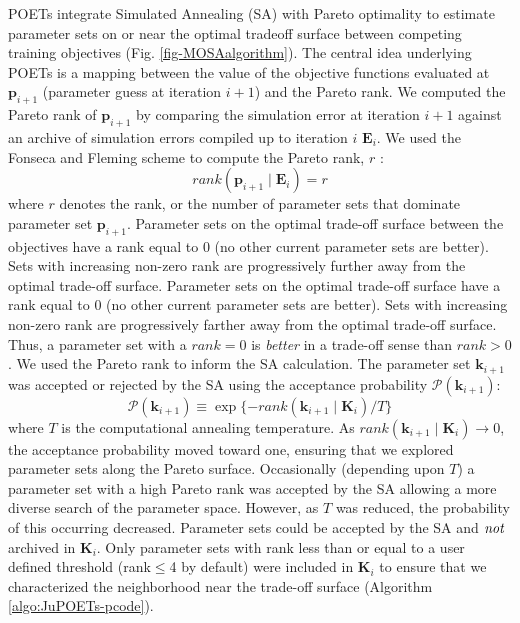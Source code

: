 \documentclass{bmcart}
\begin{document}
POETs integrate Simulated Annealing (SA) with Pareto optimality to estimate parameter sets on or near the optimal tradeoff surface between competing training objectives (Fig. \ref{fig-MOSAalgorithm}).
The central idea underlying POETs is a mapping between the value of the objective functions evaluated at $\mathbf{p}_{i+1}$ (parameter guess at iteration $i+1$) and the Pareto rank.
We computed the Pareto rank of $\mathbf{p}_{i+1}$ by comparing the simulation error at iteration $i+1$ against an archive of simulation errors compiled up to iteration $i$ $\mathbf{E}_{i}$.
We used the Fonseca and Fleming scheme to compute the Pareto rank, $r$ \cite{RANKING}:
\begin{equation}\label{eqn_rank}
rank\left(\mathbf{p}_{i+1}\mid \mathbf{E}_{i}\right)=r
\end{equation} where $r$ denotes the rank, or the number of parameter sets that dominate parameter set $\mathbf{p}_{i+1}$.
Parameter sets on the optimal trade-off surface between the objectives have a rank equal to $0$ (no other current parameter sets are better).
Sets with increasing non-zero rank are progressively further away from the optimal trade-off surface.
Parameter sets on the optimal trade-off surface have a rank equal to $0$ (no other current parameter sets are better).
Sets with increasing non-zero rank are progressively farther away from the optimal trade-off surface.
Thus, a parameter set with a $rank = 0$ is \emph{better} in a trade-off sense than $rank>0$.
We used the Pareto rank to inform the SA calculation.
The parameter set $\mathbf{k}_{i+1}$ was accepted or rejected by the SA using the acceptance probability $\mathcal{P}\left(\mathbf{k}_{i+1}\right)$:
\begin{equation}\label{eqn_costMOSA}
\mathcal{P}(\mathbf{k}_{i+1}) \equiv \exp{\{-rank\left(\mathbf{k}_{i+1} \mid \mathbf{K}_{i} \right)/T\}}
\end{equation}
where $T$ is the computational annealing temperature. As $rank\left(\mathbf{k}_{i+1}\mid \mathbf{K}_{i}\right)\rightarrow{0}$, the acceptance probability moved toward one,
ensuring that we explored parameter sets along the Pareto surface.
Occasionally (depending upon $T$) a parameter set with a high Pareto rank was accepted by the SA allowing a more diverse search of the parameter space.
However, as $T$ was reduced, the probability of this occurring decreased.
Parameter sets could be accepted by the SA and $\emph{not}$ archived in $\mathbf{K}_{i}$.
Only parameter sets with rank less than or equal to a user defined threshold (rank$\leq$4 by default) were included in $\mathbf{K}_{i}$ to ensure that we characterized the neighborhood near the trade-off surface (Algorithm \ref{algo:JuPOETs-pcode}).
\end{document}
